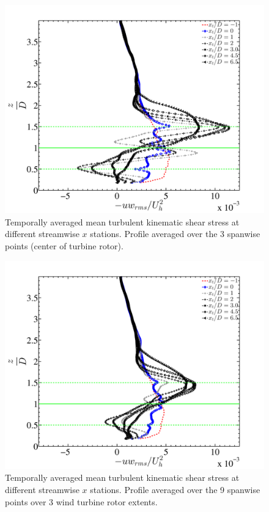 \begin{figure}
\centering
\includegraphics[width = 0.8\linewidth]{stats/shrprof_3points_avg.pdf}
\caption[Mean shear stress at $x$ stations 1]{Temporally averaged mean turbulent kinematic shear stress at different streamwise $x$ stations. Profile averaged over the  3 spanwise points (center of turbine rotor).}\label{fig:shrstat1}
\end{figure}
\begin{figure}
\centering
\includegraphics[width = 0.8\linewidth]{stats/shrprof_9points_avg.pdf}
\caption[Mean shear stress at $x$ stations 2]{Temporally averaged mean turbulent kinematic shear stress at different streamwise $x$ stations. Profile averaged over the  9 spanwise points over 3 wind turbine rotor extents.}\label{fig:shrstat2}
\end{figure}
